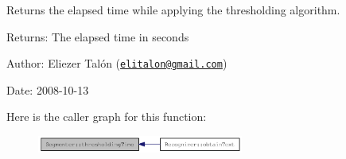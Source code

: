 Returns the elapsed time while applying the thresholding algorithm. 

\begin{Desc}
\item[Returns:]The elapsed time in seconds\end{Desc}
\begin{Desc}
\item[Author:]Eliezer Talón (\href{mailto:elitalon@gmail.com}{\tt elitalon@gmail.com}) \end{Desc}
\begin{Desc}
\item[Date:]2008-10-13 \end{Desc}


Here is the caller graph for this function:\nopagebreak
\begin{figure}[H]
\begin{center}
\leavevmode
\includegraphics[width=192pt]{class_segmenter_9114d0f3934b43478fb55077b7722d3d_icgraph}
\end{center}
\end{figure}
